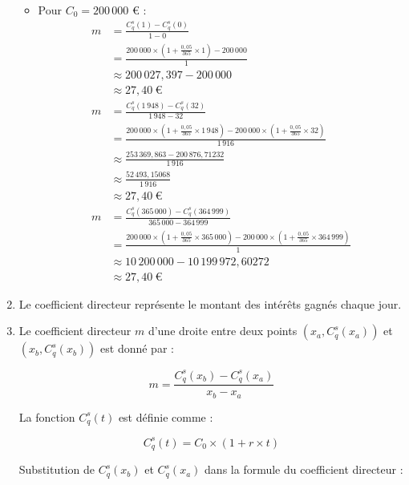 \documentclass{article}
\begin{document}
\begin{enumerate}[label=\textbf{Q\arabic*.}]
\begin{itemize}
        \item Pour \( C_0 = 200\,000 \) € :
        \[
            \begin{aligned}
            m &= \frac{C^s_q(1) - C^s_q(0)}{1 - 0} \\
              &= \frac{200\,000 \times \left(1 + \frac{0{,}05}{365} \times 1\right) - 200\,000}{1} \\
              &\approx 200\,027{,}397 - 200\,000 \\
              &\approx 27{,}40\ \text{€} \\[1em]
            m &= \frac{C^s_q(1\,948) - C^s_q(32)}{1\,948 - 32} \\
              &= \frac{200\,000 \times \left(1 + \frac{0{,}05}{365} \times 1\,948\right) - 200\,000 \times \left(1 + \frac{0{,}05}{365} \times 32\right)}{1\,916} \\
              &\approx \frac{253\,369{,}863 - 200\,876{,}71232}{1\,916} \\
              &\approx \frac{52\,493{,}15068}{1\,916} \\
              &\approx 27{,}40\ \text{€} \\[1em]
            m &= \frac{C^s_q(365\,000) - C^s_q(364\,999)}{365\,000 - 364\,999} \\
              &= \frac{200\,000 \times \left(1 + \frac{0{,}05}{365} \times 365\,000\right) - 200\,000 \times \left(1 + \frac{0{,}05}{365} \times 364\,999\right)}{1} \\
              &\approx 10\,200\,000 - 10\,199\,972,60272 \\
              &\approx 27{,}40\ \text{€}
            \end{aligned}
        \]
    \end{itemize}

    \item Le coefficient directeur représente le montant des intérêts gagnés chaque jour.

    \item Le coefficient directeur \( m \) d'une droite entre deux points \((x_a, C_q^s(x_a))\) et \((x_b, C_q^s(x_b))\) est donné par :
    
    \[
    m = \frac{C_q^s(x_b) - C_q^s(x_a)}{x_b - x_a}
    \]
    
    La fonction \( C_q^s(t) \) est définie comme :
    
    \[
    C_q^s(t) = C_0 \times \left(1 + r \times t\right)
    \]
        
    Substitution de \( C_q^s(x_b) \) et \( C_q^s(x_a) \) dans la formule du coefficient directeur :
    

\end{enumerate}
\end{document}
